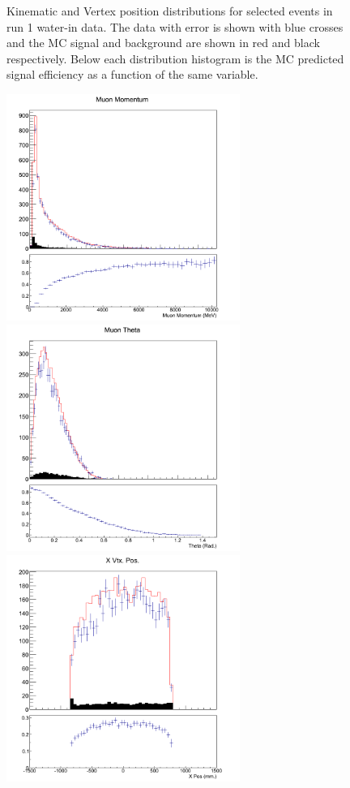 \begin{figure}[h]
\caption{Kinematic and Vertex position distributions for selected events in run 1 water-in data. The data with error is shown with blue crosses and the MC signal and background are shown in red and black respectively. Below each distribution histogram is the MC predicted signal efficiency as a function of the same variable.}
\label{fig:xs1run1water}
\end{figure}

\begin{figure}[h]
\centering
\includegraphics[width=3in]{Figures/TN100Plots/c_Pwater_2.png}
\includegraphics[width=3in]{Figures/TN100Plots/c_Thwater_2.png}
\includegraphics[width=3in]{Figures/TN100Plots/c_Xwater_2.png}

\end{figure}
